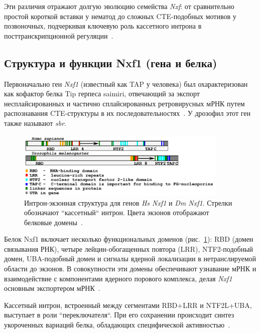 Эти различия отражают долгую эволюцию семейства \textit{Nxf}: от сравнительно простой короткой вставки у нематод до сложных CTE-подобных мотивов у позвоночных, подчеркивая ключевую роль кассетного интрона в посттранскрипционной регуляции~\cite{Mamon2013,Golubkova2012}.


\subsection{Структура и функции Nxf1 (гена и белка)}

Первоначально ген \textit{Nxf1} (известный как TAP у человека) был охарактеризован как кофактор белка Tip герпеса saimiri, отвечающий за экспорт несплайсированных и частично сплайсированных ретровирусных мРНК путем распознавания CTE-структуры в их последовательностях~\cite{Zolotukhin2001}.
У дрозофил этот ген также называют \textit{sbr}.

\begin{figure}[h] %
    \centering
    \includegraphics[width=0.9\textwidth]{images/dm_hs_nxf1_structure}
    \caption{Интрон-экзонная структура для генов \textit{Hs Nxf1} и \textit{Dm Nxf1}. Стрелки обозначают ``кассетный`` интрон. Цвета экзонов отображают белковые домены~\cite{Mamon2013}.}
    \label{fig:dm_hs_nxf1_structure}
\end{figure}

Белок Nxf1 включает несколько функциональных доменов (рис.~\ref{fig:dm_hs_nxf1_structure}): RBD (домен связывания РНК), четыре лейцин-обогащенных повтора (LRR), NTF2-подобный домен, UBA-подобный домен и сигналы ядерной локализации в нетранслируемой области до экзонов.
В совокупности эти домены обеспечивают узнавание мРНК и взаимодействие с компонентами ядерного порового комплекса, делая \textit{Nxf1} основным экспортером мРНК~\cite{Herold2000,Mamon2013}.

Кассетный интрон, встроенный между сегментами RBD+LRR и NTF2L+UBA, выступает в роли ``переключателя``.
При его сохранении происходит синтез укороченных вариаций белка, обладающих специфической активностью~\cite{Mamon2013,Herold2000}.

